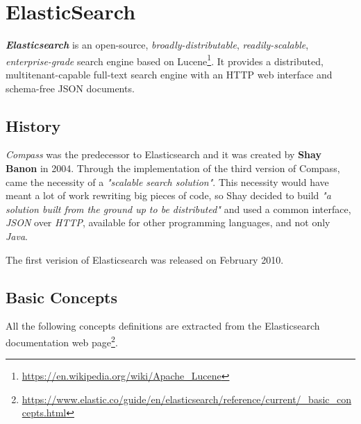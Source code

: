 \documentclass[a4paper, 12pt, english]{book}
\begin{document}
\section{ElasticSearch} %
\label{sec:elasticsearch} %

\textit{\textbf{Elasticsearch}} is an open-source, \textit{broadly-distributable}, \textit{readily-scalable}, \textit{enterprise-grade} search engine based on Lucene\footnote{\url{https://en.wikipedia.org/wiki/Apache\_Lucene}}. It provides a distributed, multitenant-capable full-text search engine with an HTTP web interface and schema-free JSON documents.

\subsection{History}
\label{subsec:elasticsearch-history}
\textit{Compass} was the predecessor to Elasticsearch and it was created by \textbf{Shay Banon} in 2004. Through the implementation of the third version of Compass, came the necessity of a \textit{"scalable search solution"}. This necessity would have meant a lot of work rewriting big pieces of code, so Shay decided to build \textit{"a solution built from the ground up to be distributed"} and used a common interface, \textit{JSON} over \textit{HTTP}, available for other programming languages, and not only \textit{Java}.

The first verision of Elasticsearch was released on February 2010.

\subsection{Basic Concepts}
\label{subsec:elasticsearch-basic-concepts}

All the following concepts definitions are extracted from the Elasticsearch documentation web page\footnote{\url{https://www.elastic.co/guide/en/elasticsearch/reference/current/_basic_concepts.html}}.
\end{document}
